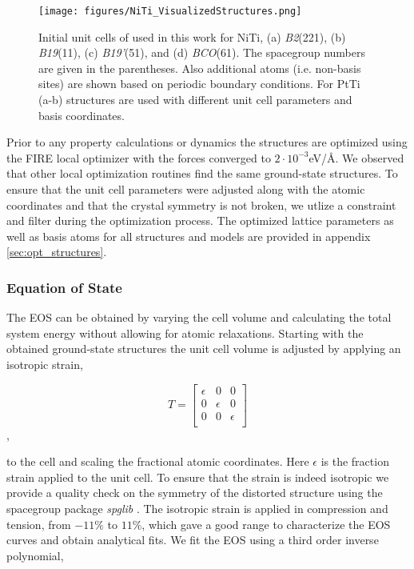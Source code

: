 \documentclass[preprint,colorlinks=true,linkcolor=black,citecolor=black]{elsarticle}
\begin{document}
\begin{figure}[ht!]
    \begin{centering}
        \texttt{[image: figures/NiTi\_VisualizedStructures.png]}
        \caption{
          Initial unit cells of used in this work for NiTi, (a) \textit{B2}(221), (b) \textit{B19}(11), (c) \textit{B19'}(51), and (d) \textit{BCO}(61). The spacegroup numbers are given in the parentheses. Also additional atoms (i.e. non-basis sites) are shown based on periodic boundary conditions. For PtTi (a-b) structures are used with different unit cell parameters and basis coordinates. 
        }
        \label{fig:niti_structures}
    \end{centering}
\end{figure}

Prior to any property calculations or dynamics the structures are optimized using the FIRE\cite{Bitzek2006} local optimizer with the forces converged to $2\cdot 10^{-3}$eV/\AA. We observed that other local optimization routines find the same ground-state structures. To ensure that the unit cell parameters were adjusted along with the atomic coordinates and that the crystal symmetry is not broken, we utlize a constraint and filter during the optimization process. The optimized lattice parameters as well as basis atoms for all structures and models are provided in appendix \ref{sec:opt_structures}. \par

\subsubsection{Equation of State}
The EOS can be obtained by varying the cell volume and calculating the total system energy without allowing for atomic relaxations. Starting with the obtained ground-state structures the unit cell volume is adjusted by applying an isotropic strain,

\begin{equation}
  \label{eq:isotropic_strain}
  T=\begin{bmatrix}
    \epsilon & 0 & 0 \\
    0 & \epsilon & 0 \\
    0 & 0 & \epsilon \\
  \end{bmatrix}
\end{equation},

to the cell and scaling the fractional atomic coordinates. Here $\epsilon$ is the fraction strain applied to the unit cell. To ensure that the strain is indeed isotropic we provide a quality check on the symmetry of the distorted structure using the spacegroup package \textit{spglib} \cite{Togo2018}. The isotropic strain is applied in compression and tension, from $-11\%$ to $11\%$, which gave a good range to characterize the EOS curves and obtain analytical fits. We fit the EOS using a third order inverse polynomial,
\end{document}
